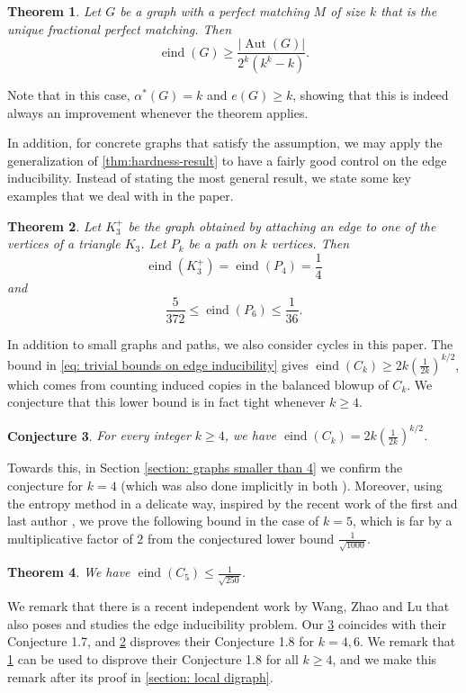 \documentclass[reqno,11pt]{amsart}
\numberwithin{equation}{section}
\newtheorem{theorem}{Theorem}[section]
\newtheorem{conjecture}[theorem]{Conjecture}
\theoremstyle{definition}
\theoremstyle{remark}
\newcommand{\abs}[1]{\left\lvert#1\right\rvert}
\DeclareMathOperator{\eind}{eind}
\DeclareMathOperator{\Aut}{Aut}
\begin{document}
\begin{theorem}\label{thm:better-construction-intro}
    Let $G$ be a graph with a perfect matching $M$ of size $k$ that is the unique fractional perfect matching.
    Then
    \[\eind(G)\geq \frac{\abs{\Aut(G)}}{2^{k}(k^{k}-k)}.\]
\end{theorem}
Note that in this case, $\alpha^*(G)=k$ and $e(G)\geq k$, showing that this is indeed always an improvement whenever the theorem applies.

In addition, for concrete graphs that satisfy the assumption, we may apply the generalization of \cref{thm:hardness-result} to have a fairly good control on the edge inducibility.
Instead of stating the most general result, we state some key examples that we deal with in the paper.

\begin{theorem}\label{thm:local-digraph-small-case}
    Let $K_3^+$ be the graph obtained by attaching an edge to one of the vertices of a triangle $K_3$.
    Let $P_k$ be a path on $k$ vertices.
    Then
    \[\eind(K_3^+)=\eind(P_4)=\frac{1}{4}\]
    and
    \[\frac{5}{372}\leq \eind(P_6)\leq \frac{1}{36}.\]
\end{theorem}


In addition to small graphs and paths, we also consider cycles in this paper.
The bound in \eqref{eq: trivial bounds on edge inducibility} gives $\eind(C_k) \ge 2k\left(\frac{1}{2k}\right)^{k/2}$, which comes from counting induced copies in the balanced blowup of $C_k$. 
We conjecture that this lower bound is in fact tight whenever $k\geq 4$. 
\begin{conjecture}\label{conj:cycle}
	For every integer $k\geq 4$, we have $\eind(C_k) = 2k\left(\frac{1}{2k}\right)^{k/2}$.
\end{conjecture}

Towards this, in Section \ref{section: graphs smaller than 4} we confirm the conjecture for $k=4$ (which was also done implicitly in both \cite{BolNarTac1986,Coh2024}). Moreover, using the entropy method in a delicate way, inspired by the recent work of the first and last author \cite{CY24turan}, we prove the following bound in the case of $k=5$, which is far by a multiplicative factor of $2$ from the conjectured lower bound $\frac{1}{\sqrt{1000}}$.

\begin{theorem}\label{thm:C5}
	We have $\eind(C_5)\leq \frac{1}{\sqrt{250}}$.  
\end{theorem}

We remark that there is a recent independent work by Wang, Zhao and Lu \cite{WanZhaLu2025} that also poses and studies the edge inducibility problem.
Our \cref{conj:cycle} coincides with their Conjecture 1.7, and \cref{thm:local-digraph-small-case} disproves their Conjecture 1.8 for $k=4,6$.
We remark that \cref{thm:better-construction-intro} can be used to disprove their Conjecture 1.8 for all $k\geq 4$, and we make this remark after its proof in \cref{section: local digraph}.
\end{document}
